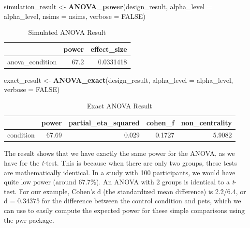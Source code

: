 \documentclass[]{book}
\newenvironment{Shaded}{\begin{snugshade}}{\end{snugshade}}
\newcommand{\DataTypeTok}[1]{\textcolor[rgb]{0.13,0.29,0.53}{#1}}
\newcommand{\KeywordTok}[1]{\textcolor[rgb]{0.13,0.29,0.53}{\textbf{#1}}}
\newcommand{\NormalTok}[1]{#1}
\newcommand{\OtherTok}[1]{\textcolor[rgb]{0.56,0.35,0.01}{#1}}
\newcommand{\StringTok}[1]{\textcolor[rgb]{0.31,0.60,0.02}{#1}}
\begin{document}
\begin{Shaded}
\begin{Highlighting}[]
\NormalTok{simulation_result <-}\StringTok{ }\KeywordTok{ANOVA_power}\NormalTok{(design_result, }
                                 \DataTypeTok{alpha_level =}\NormalTok{ alpha_level, }
                                 \DataTypeTok{nsims =}\NormalTok{ nsims,}
                                 \DataTypeTok{verbose =} \OtherTok{FALSE}\NormalTok{)}
\end{Highlighting}
\end{Shaded}

\begin{table}[t]

\caption{\label{tab:unnamed-chunk-9}Simulated ANOVA Result}
\centering
\begin{tabular}{l|r|r}
\hline
  & power & effect\_size\\
\hline
anova\_condition & 67.2 & 0.0331418\\
\hline
\end{tabular}
\end{table}

\begin{Shaded}
\begin{Highlighting}[]
\NormalTok{exact_result <-}\StringTok{ }\KeywordTok{ANOVA_exact}\NormalTok{(design_result,}
                            \DataTypeTok{alpha_level =}\NormalTok{ alpha_level,}
                            \DataTypeTok{verbose =} \OtherTok{FALSE}\NormalTok{)}
\end{Highlighting}
\end{Shaded}

\begin{table}[t]

\caption{\label{tab:unnamed-chunk-11}Exact ANOVA Result}
\centering
\begin{tabular}{l|r|r|r|r}
\hline
  & power & partial\_eta\_squared & cohen\_f & non\_centrality\\
\hline
condition & 67.69 & 0.029 & 0.1727 & 5.9082\\
\hline
\end{tabular}
\end{table}

The result shows that we have exactly the same power for the ANOVA, as we have for the \emph{t}-test. This is because when there are only two groups, these tests are mathematically identical. In a study with 100 participants, we would have quite low power (around 67.7\%). An ANOVA with 2 groups is identical to a \emph{t}-test. For our example, Cohen's d (the standardized mean difference) is 2.2/6.4, or d = 0.34375 for the difference between the control condition and pets, which we can use to easily compute the expected power for these simple comparisons using the pwr package.
\end{document}
